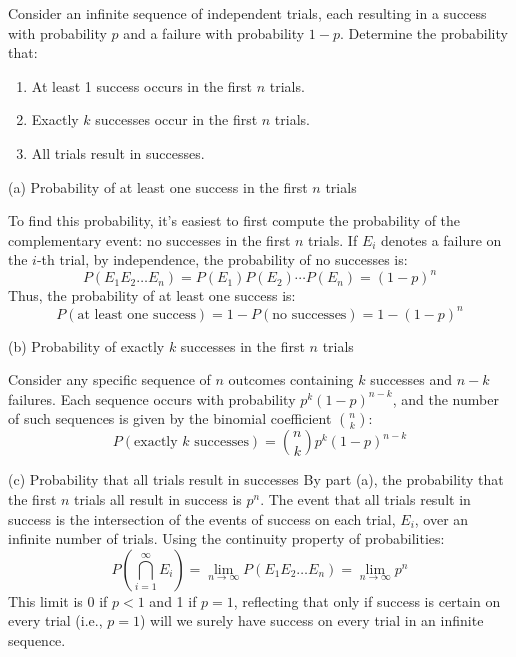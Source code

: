     \begin{example}
        Consider an infinite sequence of independent trials, each resulting in a success with probability \( p \) and a failure with probability \( 1 - p \). Determine the probability that:
\begin{enumerate}
    \item[(a)] At least 1 success occurs in the first \( n \) trials.
    \item[(b)] Exactly \( k \) successes occur in the first \( n \) trials.
    \item[(c)] All trials result in successes.
\end{enumerate}
\begin{solution}
(a) Probability of at least one success in the first \( n \) trials

To find this probability, it's easiest to first compute the probability of the complementary event: no successes in the first \( n \) trials. If \( E_i \) denotes a failure on the \( i \)-th trial, by independence, the probability of no successes is:
\[
P(E_1 E_2 \ldots E_n) = P(E_1)P(E_2) \cdots P(E_n) = (1-p)^n
\]
Thus, the probability of at least one success is:
\[
P(\text{at least one success}) = 1 - P(\text{no successes}) = 1 - (1-p)^n
\]

(b) Probability of exactly \( k \) successes in the first \( n \) trials

Consider any specific sequence of \( n \) outcomes containing \( k \) successes and \( n - k \) failures. Each sequence occurs with probability \( p^k (1-p)^{n-k} \), and the number of such sequences is given by the binomial coefficient \(\binom{n}{k}\):
\[
P(\text{exactly } k \text{ successes}) = \binom{n}{k} p^k (1-p)^{n-k}
\]

(c) Probability that all trials result in successes
By part (a), the probability that the first \( n \) trials all result in success is \( p^n \). The event that all trials result in success is the intersection of the events of success on each trial, \( E_i \), over an infinite number of trials. Using the continuity property of probabilities:
\[
P(\bigcap_{i=1}^\infty E_i) = \lim_{n \to \infty} P(E_1 E_2 \ldots E_n) = \lim_{n \to \infty} p^n
\]
This limit is 0 if \( p < 1 \) and 1 if \( p = 1 \), reflecting that only if success is certain on every trial (i.e., \( p = 1 \)) will we surely have success on every trial in an infinite sequence.

\end{solution}
    \end{example}

